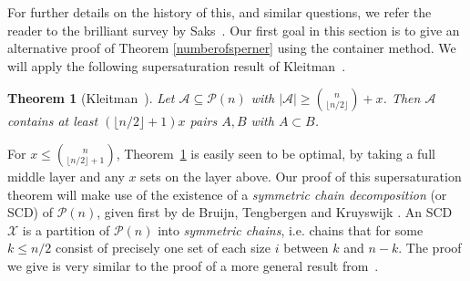 \documentclass[11pt]{article}
\newtheorem{thm}[theorem]{Theorem}
\numberwithin{equation}{section}
\begin{document}
For further details on the history of this, and similar questions, we refer the reader to the brilliant survey by Saks~\cite{sakssurvey}. Our first goal in this section is to give an alternative proof of Theorem \ref{numberofsperner} using the container method. We will apply the following supersaturation result of Kleitman~\cite{kleitmanspernersupersat}.

\begin{thm}[Kleitman~\cite{kleitmanspernersupersat}]\label{spernersupersat}
Let $\mathcal{A}\subseteq\mathcal{P}(n)$ with $|\mathcal{A}|\geq \binom{n}{\lfloor n/2\rfloor}+x$. Then $\mathcal{A}$ contains at least $\left(\lfloor n/2\rfloor +1\right)x$ pairs $A,B$ with $A\subset B$.
\end{thm}
For $x\leq \binom{n}{\lfloor n/2\rfloor+1}$, Theorem~\ref{spernersupersat} is easily seen to be optimal, by taking a full middle layer and any $x$ sets on the layer above. Our proof of this supersaturation theorem will make use of the existence of a \emph{symmetric chain decomposition} (or SCD) of $\mathcal{P}(n)$, given first by de Bruijn, Tengbergen and Kruyswijk \cite{bruijnscd}. An SCD $\mathcal{X}$ is a partition of $\mathcal P (n)$ into \emph{symmetric chains}, i.e. chains that for some $k\leq n/2$ consist of precisely  one set of each size $i$ between $k$ and $n-k$. The proof we give is very similar to the proof of a more general result from~\cite{js}.
\end{document}
